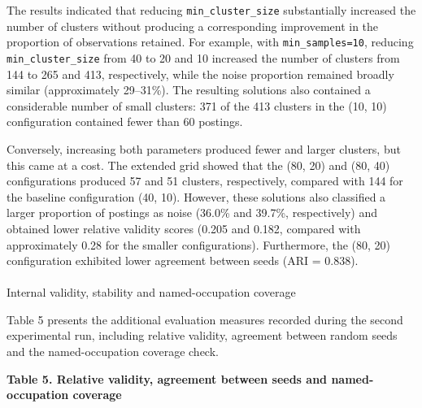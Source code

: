 \documentclass[
  letterpaper,
  DIV=11,
  numbers=noendperiod,
  sfdefaults=false]{scrartcl}
\makeatletter
\let\oldparagraph\paragraph
\renewcommand{\paragraph}{
    \@ifstar
      \xxxParagraphStar
      \xxxParagraphNoStar
  }
\newcommand{\xxxParagraphStar}[1]{\oldparagraph*{#1}\mbox{}}
\newcommand{\xxxParagraphNoStar}[1]{\oldparagraph{#1}\mbox{}}
\makeatother
\begin{document}
The results indicated that reducing \texttt{min\_cluster\_size}
substantially increased the number of clusters without producing a
corresponding improvement in the proportion of observations retained.
For example, with \texttt{min\_samples=10}, reducing
\texttt{min\_cluster\_size} from 40 to 20 and 10 increased the number of
clusters from 144 to 265 and 413, respectively, while the noise
proportion remained broadly similar (approximately 29--31\%). The
resulting solutions also contained a considerable number of small
clusters: 371 of the 413 clusters in the (10, 10) configuration
contained fewer than 60 postings.

Conversely, increasing both parameters produced fewer and larger
clusters, but this came at a cost. The extended grid showed that the
(80, 20) and (80, 40) configurations produced 57 and 51 clusters,
respectively, compared with 144 for the baseline configuration (40, 10).
However, these solutions also classified a larger proportion of postings
as noise (36.0\% and 39.7\%, respectively) and obtained lower relative
validity scores (0.205 and 0.182, compared with approximately 0.28 for
the smaller configurations). Furthermore, the (80, 20) configuration
exhibited lower agreement between seeds (ARI = 0.838).

\paragraph{Internal validity, stability and named-occupation
coverage}\label{internal-validity-stability-and-named-occupation-coverage}

Table 5 presents the additional evaluation measures recorded during the
second experimental run, including relative validity, agreement between
random seeds and the named-occupation coverage check.

\textbf{Table 5. Relative validity, agreement between seeds and
named-occupation coverage}
\end{document}
